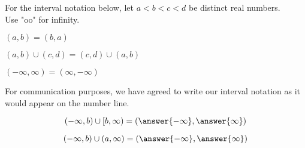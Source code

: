 \documentclass{ximera}
\author{Lee Wayand}
\begin{document}
For the interval notation below, let $a < b < c < d$ be distinct real numbers. \\

Use "oo" for infinity. \\


\begin{exercise}

$(a, b) = (b, a)$

\begin{multipleChoice}
\end{multipleChoice}

\end{exercise}




\begin{exercise}

$(a, b) \cup (c, d) = (c, d) \cup (a, b)$

\begin{multipleChoice}
\end{multipleChoice}

\end{exercise}





\begin{exercise}

$(-\infty, \infty) = (\infty, -\infty)$

\begin{multipleChoice}
\end{multipleChoice}
\begin{feedback}[correct]
For communication purposes, we have agreed to write our interval notation as it would appear on the number line.
\end{feedback}
\end{exercise}






\begin{exercise}
\[
(-\infty, b) \cup [b, \infty) = \left( \answer{-\infty}, \answer{\infty} \right)
\]
\end{exercise}







\begin{exercise}
\[
(-\infty, b) \cup (a, \infty) = \left( \answer{-\infty}, \answer{\infty} \right)
\]
\end{exercise}
\end{document}
